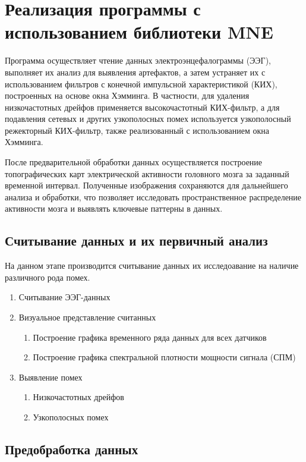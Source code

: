 \chapter{Реализация программы с использованием библиотеки MNE}
\label{ch:chap1}

    Программа осуществляет чтение данных электроэнцефалограммы (ЭЭГ), выполняет их анализ для выявления артефактов, а затем устраняет их с использованием фильтров с конечной импульсной характеристикой (КИХ), построенных на основе окна Хэмминга. В частности, для удаления низкочастотных дрейфов применяется высокочастотный КИХ-фильтр, а для подавления сетевых и других узкополосных помех используется узкополосный режекторный КИХ-фильтр, также реализованный с использованием окна Хэмминга.

    После предварительной обработки данных осуществляется построение топографических карт электрической активности головного мозга за заданный временной интервал. Полученные изображения сохраняются для дальнейшего анализа и обработки, что позволяет исследовать пространственное распределение активности мозга и выявлять ключевые паттерны в данных.

\section{Считывание данных и их первичный анализ}
    На данном этапе производится считывание данных их исследоавание на наличие различного рода помех.
    \begin{enumerate}
        \item Считывание ЭЭГ-данных
        \item Визуальное представление считанных
        \begin{enumerate}
            \item Построение графика временного ряда данных для всех датчиков
            \item Построение графика спектральной плотности мощности сигнала (СПМ)
        \end{enumerate}
        \item Выявление помех
        \begin{enumerate}
            \item Низкочастотных дрейфов
            \item Узкополосных помех
        \end{enumerate}
    \end{enumerate}

\section{Предобработка данных}

